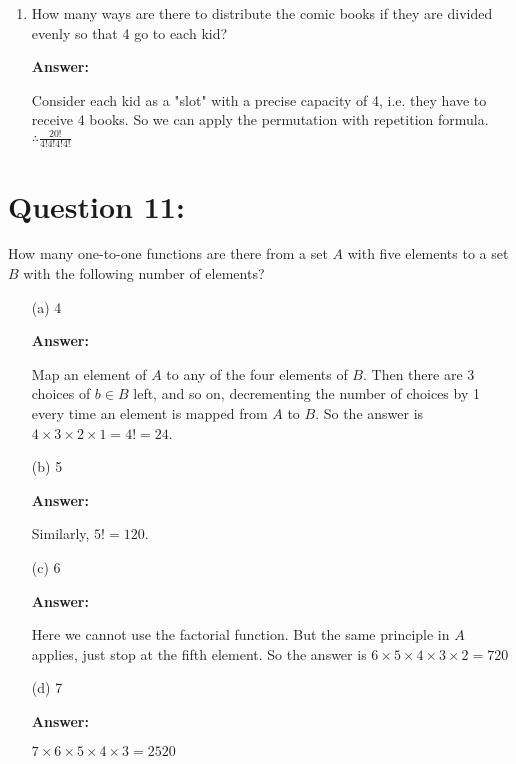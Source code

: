 \documentclass[14pt]{extreport}
\newcommand{\answer}[0]{\medskip \textbf{Answer:} \medskip}
\begin{document}
\begin{enumerate}[label=(\alph*)]
\begin{enumerate}
                    \answer
                    
                    Each book can be given to any kid, which is 5 different ways per book. No other constraints, so simply there are 5 choices 20 times. \\
                    $\therefore 5^{20}$ ways to distribute. \\
                    
            \item How many ways are there to distribute the comic books if they are divided evenly so that 4 go to each kid?
                
                    \answer
                    
                    Consider each kid as a "slot" with a precise capacity of 4, i.e. they have to receive 4 books. So we can apply the permutation with repetition formula. \\
                    $\therefore \displaystyle \frac{20!}{4!4!4!4!}$  \\
 
    \end{enumerate}
            
\end{enumerate}
\newpage

\section*{Question 11:}

How many one-to-one functions are there from a set \( A \) with five elements to a set \( B \) with the following number of elements?

\begin{enumerate}
    
    \item[(a)] 4
    
        \answer

        Map an element of \( A \) to any of the four elements of \( B \). Then there are 3 choices of \( b \in B \) left, and so on, decrementing the number of choices by 1 every time an element is mapped from \( A \) to \( B \). So the answer is \( 4 \times 3 \times 2 \times 1 = 4! = 24 \).

    \item[(b)] 5
    
        \answer

        Similarly, \( 5! = 120 \).

    \item[(c)] 6
    
        \answer

        Here we cannot use the factorial function. But the same principle in \( A \) applies, just stop at the fifth element. So the answer is \( 6 \times 5 \times 4 \times 3 \times 2 = 720 \)

    \item[(d)] 7
    
        \answer

        \( 7 \times 6 \times 5 \times 4 \times 3 = 2520 \)

\end{enumerate}
\end{document}
